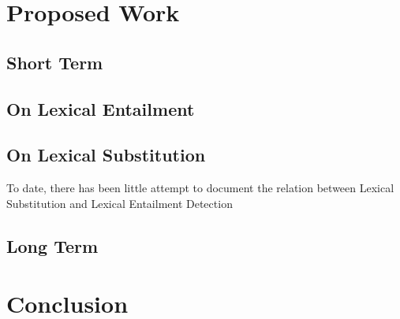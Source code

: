 \documentclass[letterpaper]{article}
\begin{document}
\section{Proposed Work}

\subsection{Short Term}

\subsection{On Lexical Entailment}
\subsection{On Lexical Substitution}

To date, there has been little attempt to document the relation between
Lexical Substitution and Lexical Entailment Detection

\subsection{Long Term}

\section{Conclusion}

\pagebreak


\end{document}
